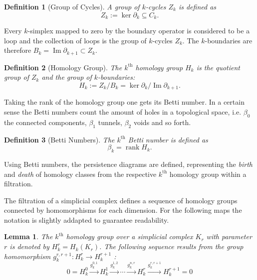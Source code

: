 \documentclass[journal]{IEEEtran}
\DeclareMathOperator{\Ima}{Im}
\DeclareMathOperator{\rank}{rank}
\newtheorem{definition}{Definition}[section]
\newtheorem{lemma}{Lemma}[definition]
\begin{document}
\begin{definition}[Group of Cycles]
A group of $k$-cycles $Z_k$ is defined as
\begin{equation}
Z_k := \ker \partial_k \subseteq C_k.
\end{equation}
\end{definition}

Every $k$-simplex mapped to zero by the boundary operator is considered to be a loop and the collection of loops is the group of $k$-cycles $Z_k$. The $k$-boundaries are therefore $B_k = \Ima \partial_{k+1} \subset Z_k$.

\begin{definition}[Homology Group]
The $k^{\text{th}}$ homology group $H_k$ is the quotient group of $Z_k$ and the group of $k$-boundaries:
\begin{equation}
  H_k := Z_k / B_k = \ker \partial_k / \Ima \partial_{k+1}.
\end{equation}
\end{definition}

Taking the rank of the homology group one gets its Betti number. In a certain sense the Betti numbers count the amount of holes in a topological space, i.e. $\beta_0$ the connected components, $\beta_1$ tunnels, $\beta_2$ voids and so forth.

\begin{definition}[Betti Numbers]
The $k^{\text{th}}$ Betti number is defined as
\begin{equation}
  \beta_k = \rank H_k.
\end{equation}
\end{definition}

Using Betti numbers, the persistence diagrams are defined, representing the \textit{birth} and \textit{death} of homology classes from the respective $k^{\text{th}}$ homology group within a filtration.

The filtration of a simplicial complex defines a sequence of homology groups connected by homomorphisms for each dimension. For the following maps the notation is slightly addapted to guarantee readability.

\begin{lemma}
The $k^{\text{th}}$ homology group over a simplicial complex $K_r$ with parameter $r$ is denoted by $H_k^r = H_k(K_r)$.
The following sequence results from the group homomorphism $g^{r,r+1}_k: H_k^r \rightarrow H_k^{r+1}$ \cite{edelsbrunner2008persistent}:
\[
  0 = H_k^0 \xrightarrow{g^{0,1}_k} H_k^1 \xrightarrow{g^{1,2}_k} \cdots \xrightarrow{g^{n,r}_k} H_k^r \xrightarrow{g^{r,r+1}_k} H_k^{r+1} = 0
\]
\end{lemma}
\end{document}
